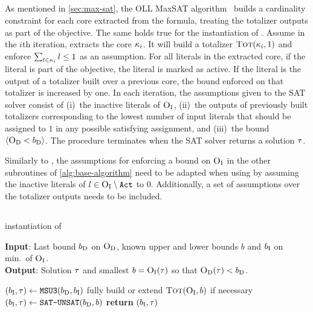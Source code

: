 \subsection{\oll{}\label{sec:oll}}

As mentioned in \cref{sec:max-sat}, the OLL MaxSAT algorithm~\autocite{DBLP:conf/cp/MorgadoDM14,DBLP:journals/jsat/IgnatievMM19} builds a cardinality constraint for each core extracted from the formula, treating the totalizer outputs as part of the objective.
The same holds true for the \oll{} instantiation of \Min{}.
Assume in the $i$th iteration, \oll{} extracts the core $\kappa_i$.
It will build a totalizer $\textsc{Tot}(\kappa_i, 1)$ and enforce $\sum_{l\in\kappa_i} l \le 1$ as an assumption.
For all literals in the extracted core, if the literal is part of the objective, the literal is marked as active.
If the literal is the output of a totalizer built over a previous core, the bound enforced on that totalizer is increased by one.
In each iteration, the assumptions given to the SAT solver consist of (i)~the inactive literals of $\textsc{O}_{\text{I}}$, (ii)~the outputs of previously built totalizers corresponding to the lowest number of input literals that should be assigned to $1$ in any possible satisfying assignment, and (iii)~the bound $\langle \textsc{O}_{\text{D}} < b_{\text{D}} \rangle$.
The procedure terminates when the SAT solver returns a solution $\tau$.

Similarly to \msu{}, the assumptions for enforcing a bound on $\textsc{O}_{\text{I}}$ in the other subroutines of \cref{alg:base-algorithm} need to be adapted when using \oll{} by assuming the inactive literals of $l \in \textsc{O}_{\text{I}} \setminus \texttt{Act}$ to $0$.
Additionally, a set of assumptions over the totalizer outputs needs to be included.

\subsection{\msh{}\label{sec:hybrid}}

\begin{algorithm}[t]
  \caption{\msh{} instantiation of \Min{}}\label{alg:msh}
  \textbf{Input}: Last bound $b_{\text{D}}$ on $\textsc{O}_{\text{D}}$, known upper and lower bounds $b$ and $b_{\text{I}}$ on min.\ of $\textsc{O}_{\text{I}}$. \\
  \textbf{Output}: Solution $\tau$ and smallest $b=\textsc{O}_{\text{I}}(\tau)$ so that $\textsc{O}_{\text{D}}(\tau)<b_{\text{D}}$.

  \begin{algorithmic}[1]
    \IF{$|\Act| < \thr \cdot |\Obj_\inc|$}
      \STATE $(b_{\text{I}},\tau) \gets \texttt{MSU3}{}(b_{\text{D}}, b_{\text{I}})$ \label{ln:msh-msu}
    \ENDIF
    \IF{$|\Act| \ge \thr \cdot |\Obj_\inc|$}
      \STATE fully build or extend $\textsc{Tot}(\textsc{O}_{\text{I}}, b)$ if necessary \label{ln:msh-tot}
      \STATE $(b_{\text{I}},\tau) \gets \texttt{SAT-\allowbreak{}UNSAT}{}(b_{\text{D}}, b)$ \label{ln:msh-su}
    \ENDIF
    \STATE \textbf{return} $(b_{\text{I}},\tau)$ \label{ln:msh-ret}
  \end{algorithmic}
\end{algorithm}

